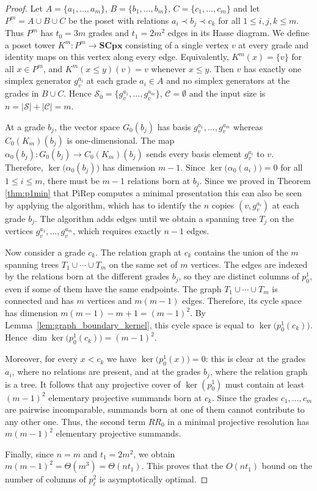 \documentclass[english,a4paper,nolineno,cleveref]{socg-lipics-v2021}
\begin{document}
\begin{proof}
Let $A=\{a_1,\ldots,a_m\}$, $B=\{b_1,\ldots,b_m\}$, $C=\{c_1,\ldots,c_m\}$ and let $P^m=A\cup B\cup C$ be the poset with relations $a_i\prec b_j\prec c_k$ for all $1\leq i,j,k\leq m$. Thus $P^m$ has $t_0=3m$ grades and $t_1=2m^2$ edges in its Hasse diagram. We define a poset tower $K^m\colon P^m\rightarrow \mathbf{SCpx}$ consisting of a single vertex $v$ at every grade and identity maps on this vertex along every edge. Equivalently, $K^m(x)=\{v\}$ for all $x\in P^m$, and $K^m(x\leq y)(v)=v$ whenever $x\leq y$. Then $v$ has exactly one simplex generator $g_v^{a_i}$ at each grade $a_i\in A$ and no simplex generators at the grades in $B\cup C$. Hence $\mathcal{S}_0=\{g_v^{a_1},\ldots,g_v^{a_m}\}$, $\mathcal{C}=\emptyset$ and the input size is $n=|\mathcal{S}|+|\mathcal{C}|=m$.

At a grade $b_j$, the vector space $G_0(b_j)$ has basis $g_v^{a_1},\ldots,g_v^{a_m}$ whereas $C_0(K_m)(b_j)$ is one-dimensional. The map $\alpha_0(b_j)\colon G_0(b_j)\rightarrow C_0(K_m)(b_j)$ sends every basis element
$g_v^{a_i}$ to $v$. Therefore, $\ker\!\big(\alpha_0(b_j)\big)$ has dimension $m-1$. Since $\ker\!\big(\alpha_0(a_i)\big)=0$ for all $1\leq i\leq m$, there must be $m-1$ relations born at $b_j$. Since we proved in Theorem \ref{thm:p1min} that {\sc PiRep} computes a minimal presentation this can also be seen by applying the algorithm, which has to identify the $n$ copies $(v,g_v^{a_i})$ at each grade $b_j$. The algorithm adds edges until we obtain a spanning tree $T_j$ on the vertices $g_v^{a_1},\ldots,g_v^{a_m}$, which requires exactly $n-1$ edges.

Now consider a grade $c_k$. The relation graph at $c_k$ contains the union of the $m$ spanning trees $T_1\cup \cdots \cup T_m$ on the same set of $m$ vertices. The edges are indexed by the relations born at the different grades $b_j$, so they are distinct columns of $p_0^1$, even if some of them have the same endpoints. The graph $T_1\cup\cdots\cup T_m$ is connected and has $m$ vertices and $m(m-1)$ edges. Therefore, its cycle space has dimension $m(m-1)-m+1=(m-1)^2$. By Lemma~\ref{lem:graph_boundary_kernel}, this cycle space is equal to
$\ker\!\big(p_0^1(c_k)\big)$. Hence $\dim \ker\!\big(p_0^1(c_k)\big)=(m-1)^2$.

Moreover, for every $x<c_k$ we have $\ker\!\big(p_0^1(x)\big)=0$: this is clear at the grades $a_i$, where no relations are present, and at the grades $b_j$, where the relation graph is a tree. It follows that any projective cover of $\ker(p_0^1)$ must contain at least $(m-1)^2$ elementary projective summands born at $c_k$. Since the grades $c_1,\ldots,c_m$ are pairwise incomparable, summands born at one of them cannot contribute to any other one. Thus, the second term $RR_0$ in a minimal projective resolution has $m(m-1)^2$ elementary projective summands.

Finally, since $n=m$ and $t_1=2m^2$, we obtain $m(m-1)^2=\Theta(m^3)=\Theta(nt_1)$. This proves that the $O(nt_1)$ bound on the number of columns of $p_\ell^2$ is asymptotically optimal.
\end{proof}
\end{document}
